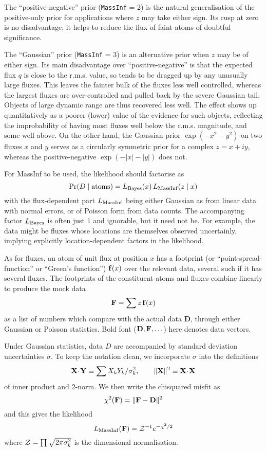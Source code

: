 The ``positive-negative'' prior ({\tt MassInf} = 2) is the natural generalisation of the positive-only
prior for applications where $z$ may take either sign.
Its cusp at zero is no disadvantage; it helps to reduce the flux of faint atoms of doubtful significance.

The ``Gaussian'' prior ({\tt MassInf} = 3) is an alternative prior when $z$ may be of either sign.
Its main disadvantage over ``positive-negative'' is that the expected flux $q$ is close to the r.m.s. value, 
so tends to be dragged up by any unusually large fluxes.
This leaves the fainter bulk of the fluxes less well controlled, whereas the largest fluxes are over-controlled and pulled back by the severe Gaussian tail.
Objects of large dynamic range are thus recovered less well.
The effect shows up quantitatively as a poorer (lower) value of the evidence for such objects, 
reflecting the improbability of having most fluxes well below the r.m.s. magnitude, and some well above.
On the other hand, the Gaussian prior $\exp(-x^2-y^2)$ on two fluxes $x$ and $y$ serves as a circularly symmetric prior for a complex $z=x+iy$, 
whereas the positive-negative $\exp(-|x|-|y|)$ does not.

\bigskip
{}
\smallskip

For MassInf to be used, the likelihood should factorise as
$$
    \Pr(D\mid {\rm atoms}) = L_{\rm Bayes}(x)\,L_{\rm MassInf}(z\mid x)
$$
with the flux-dependent part $L_{\rm MassInf}$ being either Gaussian as from linear data with normal errors, or of Poisson form from data counts.
The accompanying factor $L_{\rm Bayes}$ is often just 1 and ignorable, but it need not be.
For example, the data might be fluxes whose locations are themselves observed uncertainly,
implying explicitly location-dependent factors in the likelihood.

As for fluxes,
an atom of unit flux at position $x$ has a footprint (or ``point-spread-function'' or ``Green's function'') ${\bf f}(x)$ over the relevant data, 
several such if it has several fluxes.
The footprints of the constituent atoms and fluxes combine linearly to produce the mock data
$$
    {\bf F} = \sum z\,{\bf f}(x)
$$
as a list of numbers which compare with the actual data {\bf D}, through either Gaussian or Poisson statistics.
Bold font (${\bf D},{\bf F},\ldots$) here denotes data vectors.

\eject
{}
\smallskip

Under Gaussian statistics, data $D$ are accompanied by standard deviation uncertainties $\sigma$.
To keep the notation clean, we incorporate $\sigma$ into the definitions
$$
   {\bf X}\!\cdot\!{\bf Y} \equiv \sum X_k Y_k / \sigma_k^2, \qquad \|{\bf X}\|^2 \equiv {\bf X}\!\cdot\!{\bf X}
$$
of inner product and 2-norm.
We then write the chisquared misfit as
$$
    \chi^2({\bf F}) = \|{\bf F} - {\bf D}\|^2
$$
and this gives the likelihood
$$
    L_{\rm MassInf}({\bf F}) = {\cal Z}^{-1} e^{-\chi^2 / 2}
$$
where ${\cal Z} = \prod\sqrt{2 \pi \sigma_k^2}$ is the dimensional normalisation.

